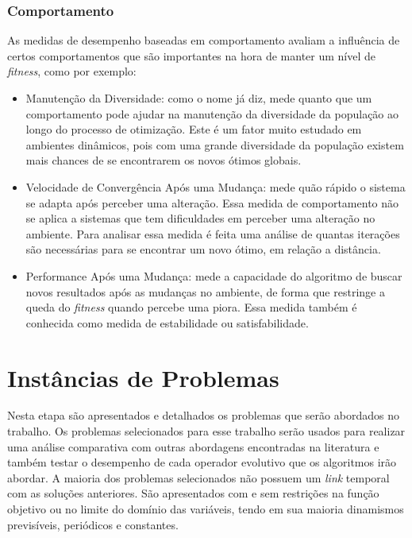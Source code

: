 \subsubsection{Comportamento}
As medidas de desempenho baseadas em comportamento avaliam a influência de certos comportamentos que são importantes na hora de manter um nível de \textit{fitness}, como por exemplo:

\begin{itemize}
\item Manutenção da Diversidade: como o nome já diz, mede quanto que um comportamento pode ajudar na manutenção da diversidade da população ao longo do processo de otimização. Este é um fator muito estudado em ambientes dinâmicos, pois com uma grande diversidade da população existem mais chances de se encontrarem os novos ótimos globais.

\item Velocidade de Convergência Após uma Mudança: mede quão rápido o sistema se adapta após perceber uma alteração. Essa medida de comportamento não se aplica a sistemas que tem dificuldades em perceber uma alteração no ambiente. Para analisar essa medida é feita uma análise de quantas iterações são necessárias para se encontrar um novo ótimo, em relação a distância.

\item Performance Após uma Mudança: mede a capacidade do algoritmo de buscar novos resultados após as mudanças no ambiente, de forma que restringe a queda do \textit{fitness} quando percebe uma piora. Essa medida também é conhecida como medida de estabilidade ou satisfabilidade.
\end{itemize}

\section{Instâncias de Problemas}
\label{sec:revisao_dinamic_problems}
Nesta etapa são apresentados e detalhados os problemas que serão abordados no trabalho. Os problemas selecionados para esse trabalho serão usados para realizar uma análise comparativa com outras abordagens encontradas na literatura e também testar o desempenho de cada operador evolutivo que os algoritmos irão abordar.
A maioria dos problemas selecionados não possuem um \textit{link} temporal com as soluções anteriores. São apresentados com e sem restrições na função objetivo ou no limite do domínio das variáveis, tendo em sua maioria dinamismos previsíveis, periódicos e constantes.

